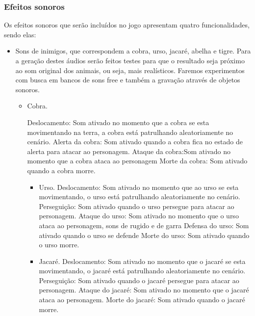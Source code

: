 \subsubsection{Efeitos sonoros}
Os efeitos sonoros que serão incluídos no jogo apresentam quatro
 funcionalidades, sendo elas:
\begin{itemize}
\item Sons de inimigos, que correspondem a cobra, urso, jacaré, abelha e tigre. 
Para a geração destes áudios serão feitos testes para que o resultado 
seja próximo ao som original dos animais, ou seja, mais realísticos. 
Faremos experimentos com busca em bancos de sons free e também a 
gravação através de objetos sonoros. 

\begin{itemize}
\item Cobra.
\begin{itemize}
\subitem Deslocamento: Som ativado no momento que a cobra se esta 
movimentando na terra, a cobra está patrulhando aleatoriamente no cenário.
\subitem Alerta da cobra: Som ativado quando a cobra fica no estado de alerta 
para atacar ao personagem.
\subitem Ataque da cobra:Som ativado no momento que a cobra ataca 
ao personagem 
\subitem Morte da cobra: Som ativado quando a cobra morre. 
\end{itemize}

\begin{itemize}
\item Urso.
\subitem Deslocamento: Som ativado no momento que ao urso se esta movimentando, 
o urso está patrulhando aleatoriamente no cenário.
\subitem Perseguição: Som ativado quando o urso persegue para atacar ao personagem.
\subitem Ataque do urso: Som ativado no momento que o urso ataca ao personagem, 
sons de rugido e de garra
\subitem Defensa do urso: Som ativado quando o urso se defende  
\subitem Morte do urso: Som ativado quando o urso morre.
\end{itemize}

\begin{itemize}
\item Jacaré.
\subitem Deslocamento: Som ativado no momento que o jacaré se esta movimentando, 
o jacaré está patrulhando aleatoriamente no cenário.
\subitem Perseguição: Som ativado quando o jacaré persegue para atacar ao personagem.
\subitem Ataque do jacaré: Som ativado no momento que o jacaré ataca ao personagem.
\subitem Morte do jacaré: Som ativado quando o jacaré morre.
\end{itemize}


\end{itemize}
\end{itemize}
